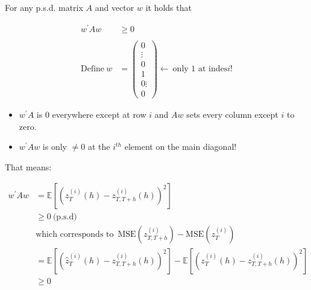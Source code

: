 \documentclass[12pt,a4paper]{article}
\begin{document}
For any p.s.d. matrix \(A\) and vector \(w\) it holds that

\begin{align*}
  w^{'} A w & \geq 0 \\
  \\
  \text{Define} \ w & = \begin{pmatrix} 0 \\ \vdots \\ 0 \\ 1 \\ 0 \vdots \\ 0 \end{pmatrix} \leftarrow \ \text{only 1 at indes} i \text{!}
\end{align*}

\begin{itemize}
  \item $w^{'} A$ is $0$ everywhere except at row $i$ and $Aw$ sets every column except $i$ to zero. 
  \item $w^{'}A w$ is only $\neq 0$ at the $i^{th}$ element on the main diagonal!
\end{itemize}

That means:

\begin{align*}
  w^{'} A w & = \mathbb{E} \left[ \left( z_T^{(i)} (h) - z_{T, T+h}^{(i)} (h) \right)^2 \right]\\
  & \geq 0 \ \text{(p.s.d)}\\
  & \text{which corresponds to} \ \; \text{MSE} \left(z_{T, T+h}^{(i)} \right) - \text{MSE} \left(z_{T}^{(i)} \right)\\
  & = \mathbb{E} \left[ \left( \hat{z}_T^{(i)} (h) - z_{T, T+h}^{(i)} (h) \right)^2 \right] - \mathbb{E} \left[ \left( z_T^{(i)} (h) - z_{T, T+h}^{(i)} (h) \right)^2 \right] \\
  & \geq 0
\end{align*}
\end{document}
